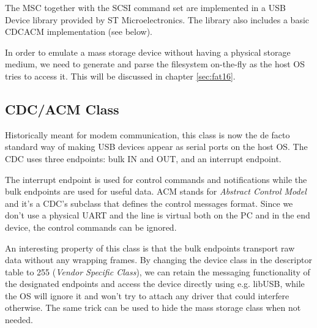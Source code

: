 




The \gls{MSC} together with the \gls{SCSI} command set are implemented in a \gls{USB} Device library provided by ST Microelectronics. The library also includes a basic \gls{CDCACM} implementation (see below).

In order to emulate a mass storage device without having a physical storage medium, we need to generate and parse the filesystem on-the-fly as the host \gls{OS} tries to access it. This will be discussed in chapter \ref{sec:fat16}.

\subsection{CDC/ACM Class} \label{sec:cdc-acm}


Historically meant for modem communication, this class is now the de facto standard way of making \gls{USB} devices appear as serial ports on the host \gls{OS}. The \gls{CDC} uses three endpoints: bulk IN and OUT, and an interrupt endpoint.

The interrupt endpoint is used for control commands and notifications while the bulk endpoints are used for useful data. \gls{ACM} stands for \textit{Abstract Control Model} and it's a \gls{CDC}'s subclass that defines the control messages format. Since we don't use a physical UART and the line is virtual both on the PC and in the end device, the control commands can be ignored.

An interesting property of this class is that the bulk endpoints transport raw data without any wrapping frames. By changing the device class in the descriptor table to 255 (\textit{Vendor Specific Class}), we can retain the messaging functionality of the designated endpoints and access the device directly using e.g. libUSB, while the \gls{OS} will ignore it and won't try to attach any driver that could interfere otherwise. The same trick can be used to hide the mass storage class when not needed.

